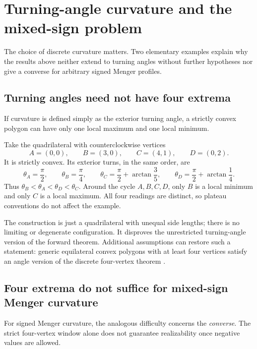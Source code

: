 \section{Turning-angle curvature and the mixed-sign problem}\label{sec:discussion}

The choice of discrete curvature matters. Two elementary examples explain
why the results above neither extend to turning angles without further
hypotheses nor give a converse for arbitrary signed Menger profiles.

\subsection{Turning angles need not have four extrema}

If curvature is defined simply as the exterior turning angle, a strictly
convex polygon can have only one local maximum and one local minimum.

\begin{example}\label{ex:turning-angle}
Take the quadrilateral with counterclockwise vertices
\[
 A=(0,0),\qquad B=(3,0),\qquad C=(4,1),\qquad D=(0,2).
\]
It is strictly convex. Its exterior turns, in the same order, are
\[
 \theta_A=\frac{\pi}{2},\qquad
 \theta_B=\frac{\pi}{4},\qquad
 \theta_C=\frac{\pi}{2}+\arctan\frac35,\qquad
 \theta_D=\frac{\pi}{2}+\arctan\frac14.
\]
Thus $\theta_B<\theta_A<\theta_D<\theta_C$. Around the cycle
$A,B,C,D$, only $B$ is a local minimum and only $C$ is a local maximum.
All four readings are distinct, so plateau conventions do not affect the
example.
\end{example}

The construction is just a quadrilateral with unequal side lengths; there
is no limiting or degenerate configuration. It disproves the unrestricted
turning-angle version of the forward theorem. Additional assumptions can
restore such a statement: generic equilateral convex polygons with at least
four vertices satisfy an angle version of the discrete four-vertex theorem
\cite[Corollary~21.6]{Pak2010}.

\subsection{Four extrema do not suffice for mixed-sign Menger curvature}

For signed Menger curvature, the analogous difficulty concerns the
\emph{converse}. The strict four-vertex window alone does not guarantee
realizability once negative values are allowed.

